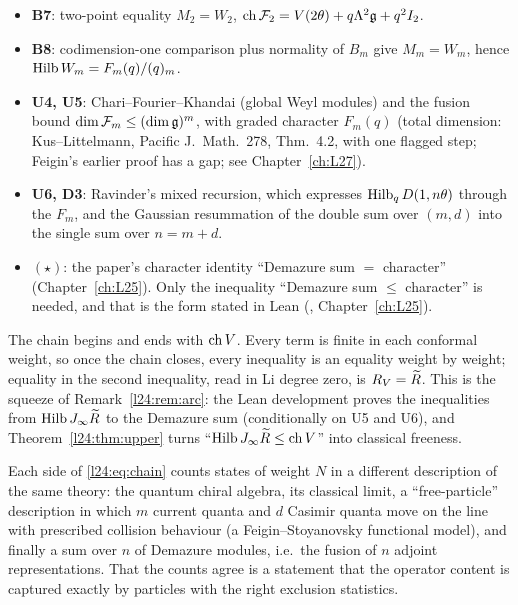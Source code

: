 \begin{itemize}
  $\ltwentyfourHilb M_m=F_m(q)/(q)_m$.
\item \textbf{B7}: two-point equality $M_2=W_2$, $\operatorname{ch}\mathcal F_2=V(2\theta)+q\Lambda^2\mathfrak g+q^2I_2$.
\item \textbf{B8}: codimension-one comparison plus normality of $B_m$ give $M_m=W_m$, hence
  $\operatorname{Hilb} W_m=F_m(q)/(q)_m$.
\item \textbf{U4, U5}: Chari--Fourier--Khandai (global Weyl modules) and the fusion bound
  $\dim\mathcal F_m\le(\dim\mathfrak g)^m$, with graded character $F_m(q)$ (total dimension: Kus--Littelmann,
  Pacific J.\ Math.\ 278, Thm.~4.2, with one flagged step; Feigin's earlier proof has a gap; see Chapter~\ref{ch:L27}).
\item \textbf{U6, D3}: Ravinder's mixed recursion, which expresses $\operatorname{Hilb}_qD(1,n\theta)$ through the $F_m$, and the
  Gaussian resummation of the double sum over $(m,d)$ into the single sum over $n=m+d$.
\item \textbf{$(\star)$}: the paper's character identity ``Demazure sum $=$ character'' (Chapter~\ref{ch:L25}). Only the
  inequality ``Demazure sum $\le$ character'' is needed, and that is the form stated in Lean (,
  Chapter~\ref{ch:L25}).
\end{itemize}
The chain begins and ends with $\operatorname{ch} V$. Every term is finite in each conformal weight, so once the chain closes,
every inequality is an equality weight by weight; equality in the second inequality, read in Li degree zero, is
$R_V=\widetilde R$. This is the squeeze of Remark~\ref{l24:rem:arc}: the Lean development proves the inequalities from
$\operatorname{Hilb}J_\infty\widetilde R$ to the Demazure sum (conditionally on U5 and U6), and
Theorem~\ref{l24:thm:upper} turns ``$\operatorname{Hilb}J_\infty\widetilde R\le\operatorname{ch} V$'' into classical freeness.

\begin{physics}
Each side of \eqref{l24:eq:chain} counts states of weight $N$ in a different description of the same
theory: the quantum chiral algebra, its classical limit, a ``free-particle'' description in which
$m$ current quanta and $d$ Casimir quanta move on the line with prescribed collision behaviour
(a Feigin--Stoyanovsky functional model), and finally a sum over $n$ of Demazure modules, i.e.\ the
fusion of $n$ adjoint representations. That the counts agree is a statement that the operator content
is captured exactly by particles with the right exclusion statistics.
\end{physics}

